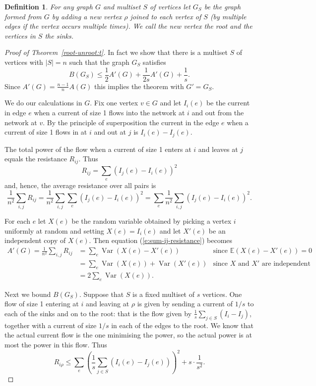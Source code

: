\documentclass[11pt]{article}
\newtheorem*{defn}{Definition}
\theoremstyle{remark}
\DeclareMathOperator\var{Var}
\def\E{\mathbb{E}}
\begin{document}
\begin{defn}
  For any graph $G$ and multiset $S$ of vertices let $G_S$ be the
  graph formed from $G$ by adding a new vertex $\rho$ joined to each
  vertex of $S$ (by multiple edges if the vertex occurs multiple
  times). We call the new vertex the \emph{root} and the vertices in
  $S$ the \emph{sinks}.
\end{defn}
\begin{proof}[Proof of Theorem~\ref{root-unroot:t}]
  In fact we show that there is a multiset $S$ of vertices with $|S|=n$
  such that the graph $G_S$ satisfies
  \[
  B(G_S)\le \frac12 A'(G) + \frac1{2s} A'(G)+\frac{1}{s}.
  \]
  Since $A'(G)=\frac{n-1}{n}A(G)$ this implies the theorem with
  $G'=G_S$.

  We do our calculations in $G$. Fix one vertex $v\in G$ and let
  $I_i(e)$ be the current in edge $e$ when a current of size 1 flows into 
  the network at $i$ and out from the network at $v$. By the principle of
  superposition the current in the edge $e$ when a current of size 1
  flows in at $i$ and out at $j$ is $I_i(e)-I_j(e)$.

  The total power of the flow when a current of size 1 enters at
  $i$ and leaves at $j$ equals the resistance $R_{ij}$. Thus
  \[
  R_{ij}=\sum_e (I_j(e)-I_i(e))^2
  \]
  and, hence, the average resistance over all pairs is 
  \begin{equation}\label{e:sum-ij-resistance}
  \frac{1}{n^2} \sum_{i,j} R_{ij}=\frac{1}{n^2}\sum_{i,j}\sum_e
  (I_j(e)-I_i(e))^2=\sum_e \frac{1}{n^2}\sum_{i,j}(I_j(e)-I_i(e))^2.
  \end{equation}

  For each $e$ let $X(e)$ be the random variable obtained by picking a
  vertex $i$ uniformly at random and setting $X(e)=I_i(e)$ and let
  $X'(e)$ be an independent copy of $X(e)$. Then equation
  (\ref{e:sum-ij-resistance}) becomes
  \begin{align*}
    A'(G)=\frac{1}{n^2} \sum_{i,j} R_{ij}
    &=\sum_e \var(X(e)-X'(e))&\text{since $\E(X(e)-X'(e))=0$}\\
    &=\sum_e \var(X(e))+\var(X'(e))&\text{since $X$ and $X'$ are independent}\\
    &=2\sum_e\var(X(e)).
  \end{align*}

  Next we bound $B(G_S)$. Suppose that $S$ is a fixed multiset of $s$
  vertices. One flow of size 1 entering at $i$ and leaving at $\rho$
  is given by sending a current of $1/s$ to each of the sinks and on
  to the root: that is the flow given by $\frac1s\sum_{j\in S}
  (I_i-I_j)$, together with a current of size $1/s$ in each of the
  edges to the root. We know that the actual current flow is the one
  minimising the power, so the actual power is at most the power in
  this flow. Thus
  \[
  R_{i\rho}\le \sum_e \left(\frac1s\sum_{j\in S}(I_i(e)-I_j(e))\right)^2+s\cdot\frac1{s^2}.
  \]


\end{proof}
\end{document}
